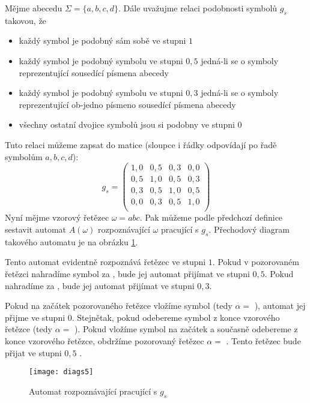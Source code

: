 \documentclass[a4paper,10pt]{article}
\begin{document}
\begin{example} \label{ex-AutRozpOmePodSym}
 Mějme abecedu $\Sigma = \{ a, b, c, d \}$. Dále uvažujme relaci podobnosti symbolů $g_s$ takovou, že
 \begin{itemize}
  \item každý symbol je podobný sám sobě ve stupni $1$
  \item každý symbol je podobný symbolu ve stupni $0,5$ jedná-li se o symboly reprezentující sousedící písmena abecedy
  \item každý symbol je podobný symbolu ve stupni $0,3$ jedná-li se o symboly reprezentující ob-jedno písmeno sousedící písmena abecedy
  \item všechny ostatní dvojice symbolů jsou si podobny ve stupni $0$
 \end{itemize}
 Tuto relaci můžeme zapsat do matice (sloupce i řádky odpovídají po řadě symbolům $a, b, c, d$):
 $$
 g_s = 
  \begin{pmatrix}
   1,0 	& 0,5	& 0,3	& 0,0 	\\
   0,5	& 1,0 	& 0,5	& 0,3	\\
   0,3	& 0,5	& 1,0 	& 0,5	\\
   0,0 	& 0,3	& 0,5	& 1,0 	\\
  \end{pmatrix}
 $$
 Nyní mějme vzorový řetězec $\omega = abc$. Pak můžeme podle předchozí definice sestavit automat $A(\omega)$ rozpoznávající $\omega$ pracující s $g_s$. Přechodový diagram takového automatu je na obrázku \ref{diag-AutRozpABCPracGS}.
 
 Tento automat evidentně rozpoznává řetězec  ve stupni $1$. Pokud v pozorovaném řetězci nahradíme symbol  za , bude jej automat přijímat ve stupni $0,5$. Pokud nahradíme  za , bude jej automat přijímat ve stupni $0,3$.
 
 Pokud na začátek pozorovaného řetězce vložíme symbol  (tedy $\alpha = $ ), automat jej přijme ve stupni $0$. Stejnětak, pokud odebereme symbol  z konce vzorového řetězce (tedy $\alpha = $ ). Pokud vložíme symbol  na začátek a současně odebereme  z konce vzorového řetězce, obdržíme pozorovaný řetězec $\alpha = $ . Tento řetězec bude přijat ve stupni $0,5$ .
 
  \begin{figure}
    \texttt{[image: diags5]}
    \caption{Automat rozpoznávající  pracující s $g_s$} \label{diag-AutRozpABCPracGS}
  \end{figure}
\end{example}
\end{document}
